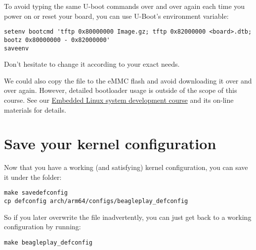 To avoid typing the same U-boot commands over and over again each time
you power on or reset your board, you can use U-Boot's 
environment variable:

{\scriptsize
\begin{verbatim}
setenv bootcmd 'tftp 0x80000000 Image.gz; tftp 0x82000000 <board>.dtb; bootz 0x80000000 - 0x82000000'
saveenv
\end{verbatim}
}

Don't hesitate to change it according to your exact needs.

We could also copy the  file to the eMMC flash and avoid
downloading it over and over again. However, detailed bootloader
usage is outside of the scope of this course. See our
\href{https://bootlin.com/training/embedded-linux/}{Embedded
Linux system development course} and its on-line materials for
details.

\section{Save your kernel configuration}

Now that you have a working (and satisfying) kernel configuration, you
can save it under the  folder:

{\scriptsize
\begin{verbatim}
make savedefconfig
cp defconfig arch/arm64/configs/beagleplay_defconfig
\end{verbatim}
}

So if you later overwrite the  file inadvertently, you can
just get back to a working configuration by running:

{\scriptsize
\begin{verbatim}
make beagleplay_defconfig
\end{verbatim}
}
